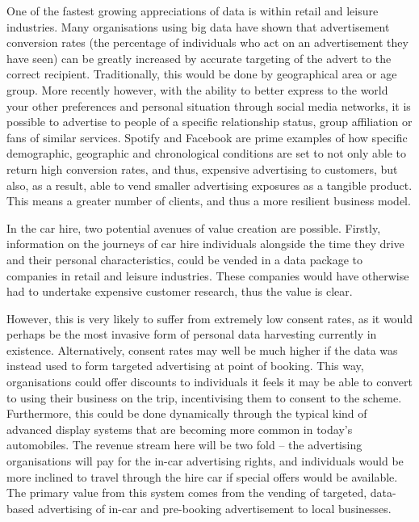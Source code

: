 \documentclass[conference]{IEEEtran}
\begin{document}
One of the fastest growing appreciations of data is within retail and
leisure industries.  Many organisations using big data have shown that
advertisement conversion rates (the percentage of individuals who act
on an advertisement they have seen) can be greatly increased by
accurate targeting of the advert to the correct
recipient. Traditionally, this would be done by geographical area or
age group. More recently however, with the ability to better express
to the world your other preferences and personal situation through
social media networks, it is possible to advertise to people of a
specific relationship status, group affiliation or fans of similar
services. Spotify and Facebook are prime examples of how specific
demographic, geographic and chronological conditions are set to not
only able to return high conversion rates, and thus, expensive
advertising to customers, but also, as a result, able to vend smaller
advertising exposures as a tangible product. This means a greater
number of clients, and thus a more resilient business model.

In the car hire, two potential avenues of value creation are possible.
Firstly, information on the journeys of car hire individuals alongside
the time they drive and their personal characteristics, could be
vended in a data package to companies in retail and leisure
industries. These companies would have otherwise had to undertake
expensive customer research, thus the value is clear.

However, this is very likely to suffer from extremely low consent
rates, as it would perhaps be the most invasive form of personal data
harvesting currently in existence. Alternatively, consent rates may
well be much higher if the data was instead used to form targeted
advertising at point of booking. This way, organisations could offer
discounts to individuals it feels it may be able to convert to using
their business on the trip, incentivising them to consent to the
scheme. Furthermore, this could be done dynamically through the
typical kind of advanced display systems that are becoming more common
in today’s automobiles. The revenue stream here will be two fold – the
advertising organisations will pay for the in-car advertising rights,
and individuals would be more inclined to travel through the hire car
if special offers would be available.  The primary value from this
system comes from the vending of targeted, data-based advertising of
in-car and pre-booking advertisement to local businesses.

\end{document}
